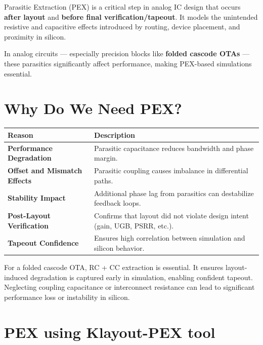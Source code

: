 \documentclass[
  11pt,
  a4paper,
  oneside]{scrbook}
\begin{document}
Parasitic Extraction (PEX) is a critical step in analog IC design that
occurs \textbf{after layout} and \textbf{before final
verification/tapeout}. It models the unintended resistive and capacitive
effects introduced by routing, device placement, and proximity in
silicon.

In analog circuits --- especially precision blocks like \textbf{folded
cascode OTAs} --- these parasitics significantly affect performance,
making PEX-based simulations essential.

\section{Why Do We Need PEX?}\label{why-do-we-need-pex}

\begin{longtable}[]{@{}
  >{\raggedright\arraybackslash}p{}
  >{\raggedright\arraybackslash}p{}@{}}
\toprule\noalign{}
\begin{minipage}[b]{\linewidth}\raggedright
Reason
\end{minipage} & \begin{minipage}[b]{\linewidth}\raggedright
Description
\end{minipage} \\
\midrule\noalign{}
\endhead
\bottomrule\noalign{}
\endlastfoot
\textbf{Performance Degradation} & Parasitic capacitance reduces
bandwidth and phase margin. \\
\textbf{Offset and Mismatch Effects} & Parasitic coupling causes
imbalance in differential paths. \\
\textbf{Stability Impact} & Additional phase lag from parasitics can
destabilize feedback loops. \\
\textbf{Post-Layout Verification} & Confirms that layout did not violate
design intent (gain, UGB, PSRR, etc.). \\
\textbf{Tapeout Confidence} & Ensures high correlation between
simulation and silicon behavior. \\
\end{longtable}

For a folded cascode OTA, RC + CC extraction is essential. It ensures
layout-induced degradation is captured early in simulation, enabling
confident tapeout. Neglecting coupling capacitance or interconnect
resistance can lead to significant performance loss or instability in
silicon.

\section{PEX using Klayout-PEX tool}\label{pex-using-klayout-pex-tool}
\end{document}
